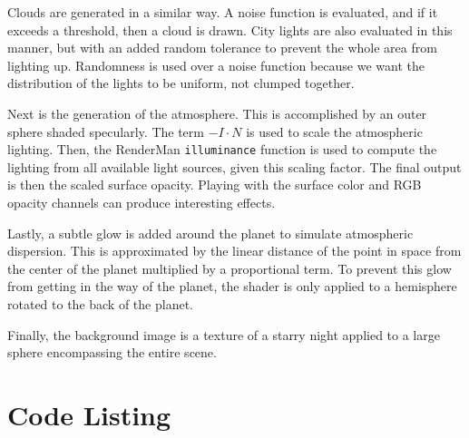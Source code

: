 \documentclass[12pt,letterpaper,titlepage]{article}
\begin{document}
Clouds are generated in a similar way. A noise function is evaluated, and if it
exceeds a threshold, then a cloud is drawn. City lights are also evaluated in
this manner, but with an added random tolerance to prevent the whole area from
lighting up. Randomness is used over a noise function because we want the
distribution of the lights to be uniform, not clumped together.

Next is the generation of the atmosphere. This is accomplished by an outer
sphere shaded specularly. The term $-I \cdot N$ is used to scale the atmospheric
lighting. Then, the RenderMan \texttt{illuminance} function is used to compute
the lighting from all available light sources, given this scaling factor. The
final output is then the scaled surface opacity. Playing with the surface color
and RGB opacity channels can produce interesting effects.

Lastly, a subtle glow is added around the planet to simulate atmospheric
dispersion. This is approximated by the linear distance of the point in space
from the center of the planet multiplied by a proportional term. To prevent this
glow from getting in the way of the planet, the shader is only applied to a
hemisphere rotated to the back of the planet.

Finally, the background image is a texture of a starry night applied to a large
sphere encompassing the entire scene.

\section{Code Listing}






\end{document}

